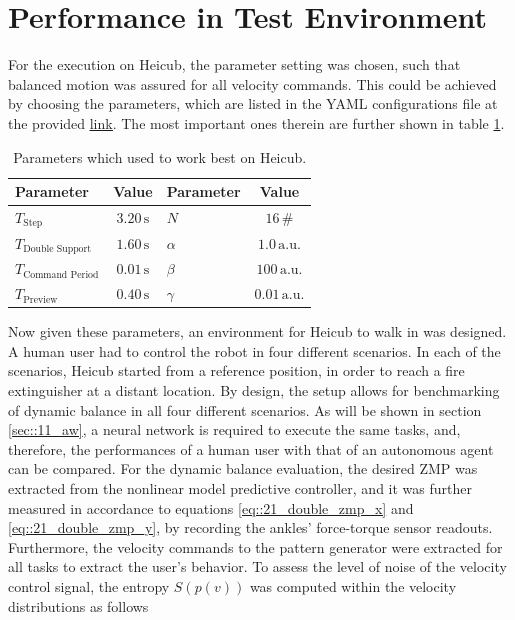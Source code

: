\section{Performance in Test Environment}
\label{sec::92_pt}
For the execution on Heicub, the parameter setting was chosen, such that balanced motion was assured for all velocity commands. This could be achieved by choosing the parameters, which are listed in the YAML configurations file at the provided \href{https://github.com/mhubii/nmpc_pattern_generator/blob/719fde0bb73925923de85cbf379c5523e075dfeb/libs/pattern_generator/configs.yaml#L1}{\underline{link}}. The most important ones therein are further shown in table \ref{tab::92_params}.
\begin{table}
	\centering
	\caption{Parameters which used to work best on Heicub.}
	\begin{tabular}{lclc}
		Parameter&Value&Parameter&Value\\
		\hline
		$T_{\text{Step}}$ & $3.20\,\text{s}$ & $N$ & $16\,\text{\#}$ \\
		$T_{\text{Double Support}}$ & $1.60\,\text{s}$ & $\alpha$ & $1.0\,\text{a.u.}$ \\
		$T_{\text{Command Period}}$  & $0.01\,\text{s}$& $\beta$ & $100\,\text{a.u.}$ \\
		$T_{\text{Preview}}$ & $0.40\,\text{s}$ & $\gamma$ & $0.01\,\text{a.u.}$
	\end{tabular}
	\label{tab::92_params}
\end{table}
Now given these parameters, an environment for Heicub to walk in was designed. A human user had to control the robot in four different scenarios. In each of the scenarios, Heicub started from a reference position, in order to reach a fire extinguisher at a distant location. By design, the setup allows for benchmarking of dynamic balance in all four different scenarios. As will be shown in section \ref{sec::11_aw}, a neural network is required to execute the same tasks, and, therefore, the performances of a human user with that of an autonomous agent can be compared. For the dynamic balance evaluation, the desired ZMP was extracted from the nonlinear model predictive controller, and it was further measured in accordance to equations \ref{eq::21_double_zmp_x} and \ref{eq::21_double_zmp_y}, by recording the ankles' force-torque sensor readouts. Furthermore, the velocity commands to the pattern generator were extracted for all tasks to extract the user's behavior. To assess the level of noise of the velocity control signal, the entropy $S(p(v))$ was computed within the velocity distributions as follows
